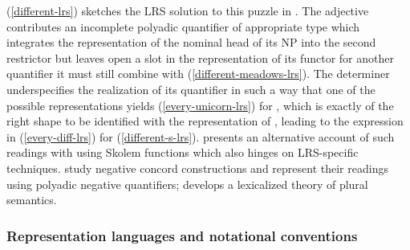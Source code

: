 \documentclass[output=paper
 	        ,biblatex
                ,babelshorthands
                ,newtxmath
                ,draftmode
                ,colorlinks, citecolor=brown
]{langscibook}
\begin{document}
\noindent
(\ref{different-lrs}) sketches the LRS solution to this puzzle in
\citet{Richter2016}. The
adjective  contributes an incomplete polyadic
quantifier of appropriate type which integrates the representation of
the nominal head of its NP into the second restrictor but leaves open
a slot in the representation of its functor for another quantifier it
must still combine with (\ref{different-meadows-lrs}). The determiner
 underspecifies the realization of its quantifier in such
a way that one of the possible representations yields
(\ref{every-unicorn-lrs}) for , which is exactly
of the right shape to be identified with the representation of
, leading to the expression in
(\ref{every-diff-lrs}) for (\ref{different-s-lrs}).
\citet{Lahm2016b} presents an alternative account of such readings
with  using Skolem functions which also hinges on
LRS-specific techniques. \citet{IordachioaiaandRichter2015} study 
negative concord constructions and represent their readings using polyadic negative
quantifiers; \citet{Lahm2018} develops a lexicalized theory
of plural semantics.




\subsubsection{Representation languages and notational conventions}
\end{document}
